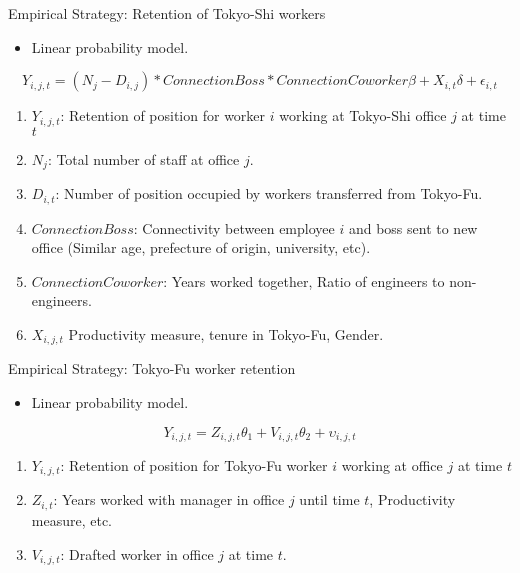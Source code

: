 \begin{frame}{Empirical Strategy: Retention of Tokyo-Shi workers}
\begin{itemize}
    \item Linear probability model.
\end{itemize}
\begin{equation}
    Y_{i,j,t} = (N_j-D_{i,j})*ConnectionBoss * ConnectionCoworker \beta + X_{i,t}\delta +\epsilon_{i,t}
    \end{equation}
    \begin{enumerate}
        \item $Y_{i,j,t}$: Retention of position for worker $i$ working at Tokyo-Shi office $j$ at time $t$
        \item $N_j$: Total number of staff at office $j$.
        \item $D_{i,t}$: Number of position occupied by workers transferred from Tokyo-Fu.
        \item $ConnectionBoss$: Connectivity between employee $i$ and boss sent to new office (Similar age, prefecture of origin, university, etc). 
        \item $ConnectionCoworker$: Years worked together, Ratio of engineers to non-engineers.
        \item $X_{i,j,t}$ Productivity measure, tenure in Tokyo-Fu, Gender.
    \end{enumerate}
    \end{frame}

\begin{frame}{Empirical Strategy: Tokyo-Fu worker retention}
\begin{itemize}
    \item Linear probability model.
\end{itemize}
\begin{equation}
    Y_{i,j,t} = Z_{i,j,t} \theta_1 + V_{i,j,t}\theta_2 +\upsilon_{i,j,t}
    \end{equation}
\begin{enumerate}
    \item $Y_{i,j,t}$: Retention of position for Tokyo-Fu worker $i$ working at office $j$ at time $t$
    \item $Z_{i,t}$: Years worked with manager in office $j$ until time $t$, Productivity measure, etc. 
    \item $V_{i,j,t}$: Drafted worker in office $j$ at time $t$.
\end{enumerate}
\end{frame}

